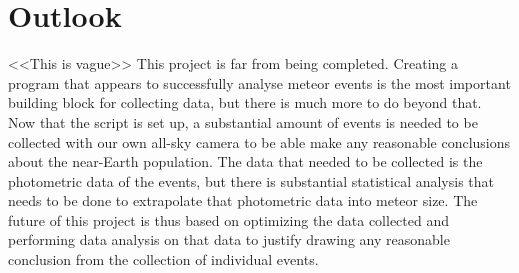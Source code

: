 \section{Outlook}
<<This is vague>>
This project is far from being completed. Creating a program that appears to successfully analyse meteor events is the most important building block for collecting data, but there is much more to do beyond that. Now that the script is set up, a substantial amount of events is needed to be collected with our own all-sky camera to be able make any reasonable conclusions about the near-Earth population. The data that needed to be collected is the photometric data of the events, but there is substantial statistical analysis that needs to be done to extrapolate that photometric data into meteor size. The future of this project is thus based on optimizing the data collected and performing data analysis on that data to justify drawing any reasonable conclusion from the collection of individual events.
